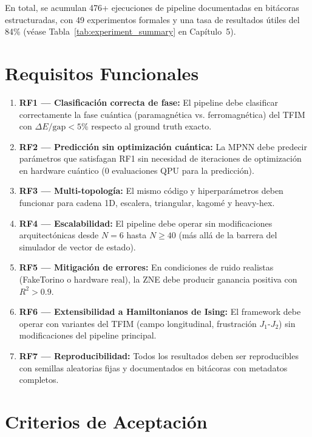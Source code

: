 \documentclass[11pt,a4paper,spanish]{book}
\begin{document}
En total, se acumulan 476+ ejecuciones de pipeline documentadas en bitácoras estructuradas, con 49 experimentos formales y una tasa de resultados útiles del 84\% (véase Tabla~\ref{tab:experiment_summary} en Capítulo~5).

\section{Requisitos Funcionales}

\begin{enumerate}
    \item \textbf{RF1 --- Clasificación correcta de fase:} El pipeline debe clasificar correctamente la fase cuántica (paramagnética vs. ferromagnética) del TFIM con $\Delta E/\text{gap} < 5\%$ respecto al ground truth exacto.

    \item \textbf{RF2 --- Predicción sin optimización cuántica:} La MPNN debe predecir parámetros que satisfagan RF1 sin necesidad de iteraciones de optimización en hardware cuántico (0 evaluaciones QPU para la predicción).

    \item \textbf{RF3 --- Multi-topología:} El mismo código y hiperparámetros deben funcionar para cadena 1D, escalera, triangular, kagomé y heavy-hex.

    \item \textbf{RF4 --- Escalabilidad:} El pipeline debe operar sin modificaciones arquitectónicas desde $N = 6$ hasta $N \geq 40$ (más allá de la barrera del simulador de vector de estado).

    \item \textbf{RF5 --- Mitigación de errores:} En condiciones de ruido realistas (FakeTorino o hardware real), la ZNE debe producir ganancia positiva con $R^2 > 0.9$.

    \item \textbf{RF6 --- Extensibilidad a Hamiltonianos de Ising:} El framework debe operar con variantes del TFIM (campo longitudinal, frustración $J_1$-$J_2$) sin modificaciones del pipeline principal.

    \item \textbf{RF7 --- Reproducibilidad:} Todos los resultados deben ser reproducibles con semillas aleatorias fijas y documentados en bitácoras con metadatos completos.
\end{enumerate}

\section{Criterios de Aceptación}
\end{document}
